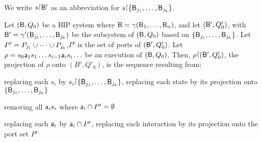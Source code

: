We write $s \pj \B'$ as an abbreviation for $s \pj \set{\B_{j_1},\dots,\B_{j_k}}$.



\label{def.bip.execution.projection}
Let $(\mathsf{B}, Q_0)$ be a BIP system where $\mathsf{B} = \gamma(\mathsf{B}_1,\dots,\mathsf{B}_n)$, and let $(\mathsf{B}', Q'_0)$, with $\mathsf{B}'
= \gamma'(\mathsf{B}_{j_1},\dots,\mathsf{B}_{j_k})$ be the subsystem of $(\mathsf{B}, Q_0)$ based on $\{ \mathsf{B}_{j_1},\dots,\mathsf{B}_{j_k} \}$.
Let $P' = P_{j_1} \cup \cdots \cup P_{j_k}$,\ie $P'$ is the set of ports of $(\mathsf{B}', Q'_0)$.
%
Let $\rho = s_0 \mathsf{a}_1 s_1 \ldots s_{i-1} \mathsf{a}_i s_i \ldots$ be an execution of $(\mathsf{B}, Q_0)$.  Then, $\rho \pj (\B', Q'_0)$, the projection
of $\rho$ onto $(B', Q'_0)$, is the sequence resulting from:
\bn
\item \label{def.clause.bip.execution.projection.state} 
replacing each $s_i$ by $s_i \pj \set{\B_{j_1},\dots,\B_{j_k}}$, \ie replacing each state by its
projection onto $\{ \mathsf{B}_{j_1},\dots,\mathsf{B}_{j_k} \}$

\item \label{def.clause.bip.execution.projection.action} removing all $\mathsf{a}_i s_i$ where $\mathsf{a}_i \cap P' = \emptyset$   %

\item \label{def.clause.bip.execution.projection.port} replacing each $\mathsf{a}_i$ by $\mathsf{a}_i \cap P'$, \ie replacing each
interaction by its projection onto the port set $P'$ 

\en
\ed



